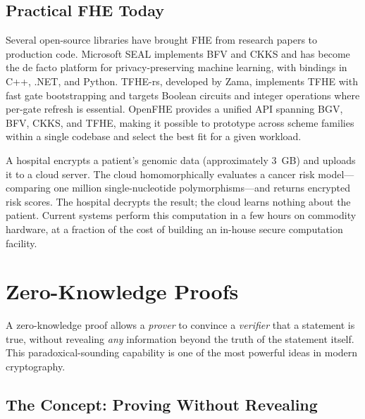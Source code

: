 \subsection{Practical FHE Today}
\label{subsec:fhe-practice}

Several open-source libraries have brought FHE from research papers to production code.  Microsoft SEAL implements BFV and CKKS and has become the de facto platform for privacy-preserving machine learning, with bindings in C++, .NET, and Python.  TFHE-rs, developed by Zama, implements TFHE with fast gate bootstrapping and targets Boolean circuits and integer operations where per-gate refresh is essential.  OpenFHE provides a unified API spanning BGV, BFV, CKKS, and TFHE, making it possible to prototype across scheme families within a single codebase and select the best fit for a given workload.

\begin{example}
\label{ex:fhe-medical}
A hospital encrypts a patient's genomic data (approximately 3~GB) and uploads it to a cloud server.  The cloud homomorphically evaluates a cancer risk model---comparing one million single-nucleotide polymorphisms---and returns encrypted risk scores.  The hospital decrypts the result; the cloud learns nothing about the patient.  Current systems perform this computation in a few hours on commodity hardware, at a fraction of the cost of building an in-house secure computation facility.
\end{example}


\section{Zero-Knowledge Proofs}
\label{sec:zkp}

A zero-knowledge proof allows a \emph{prover} to convince a \emph{verifier} that a statement is true, without revealing \emph{any} information beyond the truth of the statement itself.  This paradoxical-sounding capability is one of the most powerful ideas in modern cryptography.

\subsection{The Concept: Proving Without Revealing}
\label{subsec:zkp-concept}

